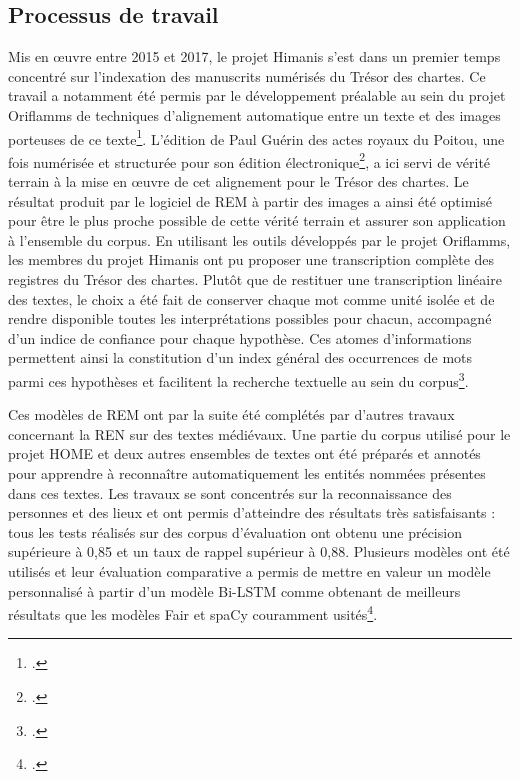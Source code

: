 \documentclass[a4paper,12pt,twoside]{book}
\begin{document}
	\subsection{Processus de travail}
	
	Mis en œuvre entre 2015 et 2017, le projet Himanis s'est dans un premier temps concentré sur l'indexation des manuscrits numérisés du Trésor des chartes. Ce travail a notamment été permis par le développement préalable au sein du projet Oriflamms de techniques d'alignement automatique entre un texte et des images porteuses de ce texte\footcite{bluche_automatic_2016}. L'édition de Paul Guérin des actes royaux du Poitou, une fois numérisée et structurée pour son édition électronique\footcite{guerin_actes_1881}, a ici servi de vérité terrain à la mise en œuvre de cet alignement pour le Trésor des chartes. Le résultat produit par le logiciel de REM à partir des images a ainsi été optimisé pour être le plus proche possible de cette vérité terrain et assurer son application à l'ensemble du corpus. En utilisant les outils développés par le projet Oriflamms, les membres du projet Himanis ont pu proposer une transcription complète des registres du Trésor des chartes. Plutôt que de restituer une transcription linéaire des textes, le choix a été fait de conserver chaque mot comme unité isolée et de rendre disponible toutes les interprétations possibles pour chacun, accompagné d'un indice de confiance pour chaque hypothèse. Ces atomes d'informations permettent ainsi la constitution d'un index général des occurrences de mots parmi ces hypothèses et facilitent la recherche textuelle au sein du corpus\footcite{stutzmann_recherche_2017}.
	
	Ces modèles de REM ont par la suite été complétés par d'autres travaux concernant la REN sur des textes médiévaux. Une partie du corpus utilisé pour le projet HOME et deux autres ensembles de textes ont été préparés et annotés pour apprendre à reconnaître automatiquement les entités nommées présentes dans ces textes. Les travaux se sont concentrés sur la reconnaissance des personnes et des lieux et ont permis d'atteindre des résultats très satisfaisants : tous les tests réalisés sur des corpus d'évaluation ont obtenu une précision supérieure à 0,85 et un taux de rappel supérieur à 0,88. Plusieurs modèles ont été utilisés et leur évaluation comparative a permis de mettre en valeur un modèle personnalisé à partir d'un modèle Bi-LSTM comme obtenant de meilleurs résultats que les modèles Fair et spaCy couramment usités\footcite{torres_aguilar_named_2021}.
	
\end{document}
